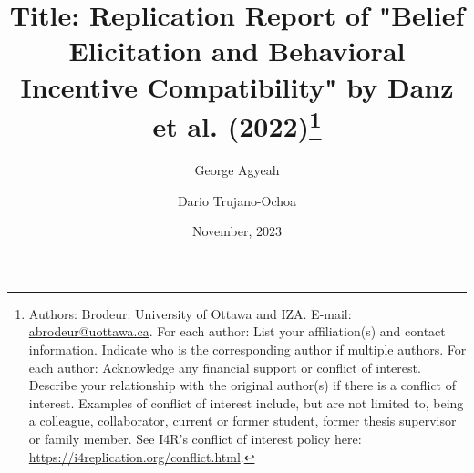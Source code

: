 \documentclass[12pt,a4paper]{article}
\begin{document}
	
	\date{November, 2023}
	
	\title{Title: Replication Report of "Belief Elicitation and Behavioral Incentive Compatibility" by  Danz et al. (2022)\thanks{Authors: 
			Brodeur: University of Ottawa and IZA. E-mail: \href{mailto:abrodeur@uottawa.ca}%
			{abrodeur@uottawa.ca}. For each author: List your affiliation(s) and contact information. Indicate who is the corresponding author if multiple authors. For each author: Acknowledge any financial support or conflict of interest. Describe your relationship with the original author(s) if there is a conflict of interest. Examples of conflict of interest include, but are not limited to, being a colleague, collaborator, current or former student, former thesis supervisor or family member. See I4R’s conflict of interest policy here: \url{https://i4replication.org/conflict.html}.}}
	\author{George Agyeah \and Dario Trujano-Ochoa}
	
	\maketitle
	
\end{document}
